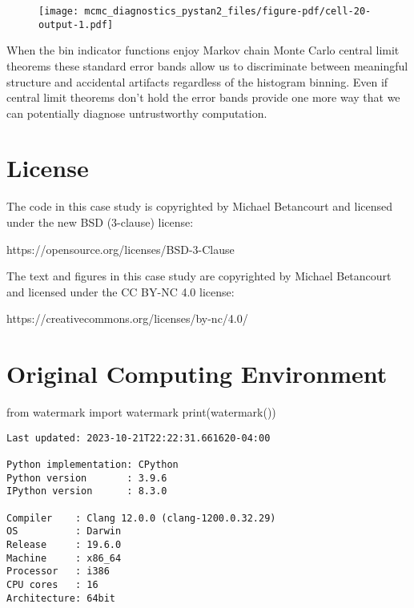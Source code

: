 \documentclass[
  letterpaper,
  DIV=11,
  numbers=noendperiod]{scrartcl}
\newenvironment{Shaded}{\begin{snugshade}}{\end{snugshade}}
\newcommand{\BuiltInTok}[1]{\textcolor[rgb]{0.00,0.23,0.31}{#1}}
\newcommand{\ImportTok}[1]{\textcolor[rgb]{0.00,0.46,0.62}{#1}}
\newcommand{\NormalTok}[1]{\textcolor[rgb]{0.00,0.23,0.31}{#1}}
\begin{document}
\begin{figure}[H]

{\centering \texttt{[image: mcmc\_diagnostics\_pystan2\_files/figure-pdf/cell-20-output-1.pdf]}

}

\end{figure}

When the bin indicator functions enjoy Markov chain Monte Carlo central
limit theorems these standard error bands allow us to discriminate
between meaningful structure and accidental artifacts regardless of the
histogram binning. Even if central limit theorems don't hold the error
bands provide one more way that we can potentially diagnose
untrustworthy computation.

\hypertarget{license}{%
\section*{License}\label{license}}

The code in this case study is copyrighted by Michael Betancourt and
licensed under the new BSD (3-clause) license:

https://opensource.org/licenses/BSD-3-Clause

The text and figures in this case study are copyrighted by Michael
Betancourt and licensed under the CC BY-NC 4.0 license:

https://creativecommons.org/licenses/by-nc/4.0/

\hypertarget{original-computing-environment}{%
\section*{Original Computing
Environment}\label{original-computing-environment}}

\begin{Shaded}
\begin{Highlighting}[]
\ImportTok{from}\NormalTok{ watermark }\ImportTok{import}\NormalTok{ watermark}
\BuiltInTok{print}\NormalTok{(watermark())}
\end{Highlighting}
\end{Shaded}

\begin{verbatim}
Last updated: 2023-10-21T22:22:31.661620-04:00

Python implementation: CPython
Python version       : 3.9.6
IPython version      : 8.3.0

Compiler    : Clang 12.0.0 (clang-1200.0.32.29)
OS          : Darwin
Release     : 19.6.0
Machine     : x86_64
Processor   : i386
CPU cores   : 16
Architecture: 64bit
\end{verbatim}
\end{document}
